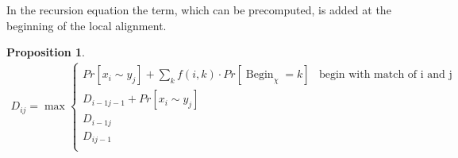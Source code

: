 \documentclass{article}
\newtheorem{proposition}{Proposition}
\newcommand{\Begin}{\operatorname{Begin}}
\begin{document}
In the recursion equation the term, which can be precomputed, is added at the
beginning of the local alignment.
\begin{proposition}
  \begin{align*}
    D_{ij} = \max 
    \begin{cases}
      Pr[x_i\sim y_j] + \sum_{k} f(i,k) \cdot Pr[\Begin_\chi=k] & \text{begin with match of i and j}\\
      D_{i-1 j-1} + Pr[x_i\sim y_j]&\\
      D_{i-1 j} &\\
      D_{i j-1} &\\
    \end{cases}
  \end{align*}
\end{proposition}
\end{document}
